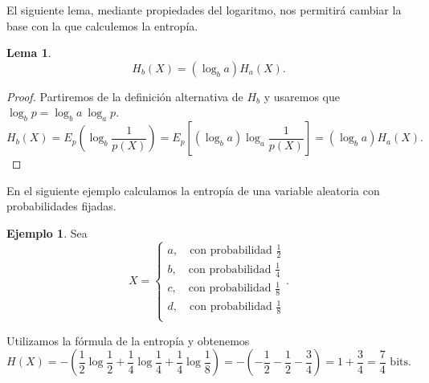 \documentclass[10pt,a4paper]{article} %
\theoremstyle{definition}
\newtheorem{lemma}[theorem]{Lema}
\newtheorem{example}[theorem]{Ejemplo}
\begin{document}
El siguiente lema, mediante propiedades del logaritmo, nos permitirá cambiar la base con la que calculemos la entropía.\\

\begin{lemma}\[H_b(X) = (\log_ba) H_a(X).\]
\end{lemma}
\begin{proof}
  Partiremos de la definición alternativa de $H_b$ y usaremos que $\log_bp = \log_ba\ \log_ap$.
  \[
  H_b(X) = E_p \left(\log_b \frac{1}{p(X)}\right ) = E_p \left [ \left ( \log_b a \right )\log_a \frac{1}{p(X)} \right ] = \left ( \log_b{a} \right ) H_a(X).
  \]
\end{proof}

En el siguiente ejemplo calculamos la entropía de una variable aleatoria con probabilidades fijadas.
\begin{example}
  Sea  \[X = 
     \begin{cases}
       a, \quad\text{con probabilidad } \frac{1}{2}\\
       b, \quad\text{con probabilidad } \frac{1}{4} \\
       c, \quad\text{con probabilidad } \frac{1}{8} \\
       d, \quad\text{con probabilidad } \frac{1}{8} \\
     \end{cases}.\]

     Utilizamos la fórmula de la entropía y obtenemos \[H(X) = - \left (\frac{1}{2} \log \frac{1}{2} + \frac{1}{4} \log \frac{1}{4} + \frac{1}{4} \log \frac{1}{8} \right ) = - \left (-\frac{1}{2} - \frac{1}{2} - \frac{3}{4} \right ) = 1 + \frac{3}{4} = \frac{7}{4} \text{ bits}.\]\\
\end{example}
\end{document}
